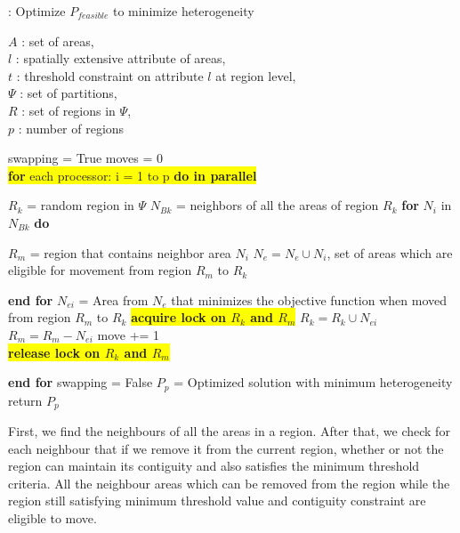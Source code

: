 \documentclass[conference]{IEEEtran}
\begin{document}
\begin{algorithm}
\scriptsize
\caption{: Optimize $P_{feasible}$ to minimize heterogeneity~\cite{r1}}
$A$ : set of areas,\\
$l$ : spatially extensive attribute of areas,\\
$t$ : threshold constraint on attribute $l$ at region level,\\
$\Psi$ : set of partitions,\\
$R$ : set of regions in $\Psi$,\\
$p$ : number of regions
\begin{algorithmic}
\STATE swapping = True
	\STATE moves = 0\\
	\vbox{\colorbox{yellow}{\vbox{\STATE \textbf{for} each processor: i = 1 to p \textbf{do in parallel}}}}
	\begin{ALC@g}	
		\STATE $R_k$ = random region in $\Psi$
		\STATE $N_{Bk}$ = neighbors of all the areas of region $R_k$
		\STATE \textbf{for} $N_i$ in $N_{Bk}$ \textbf{do}
		\begin{ALC@g}
			\STATE $R_m$ = region that contains neighbor area $N_i$
				\STATE $N_e = N_e \cup N_i$, set of areas which are eligible for movement from region $R_m$ to $R_k$
			\ENDIF
		\end{ALC@g}
		\STATE \textbf{end for}
			\STATE $N_{ei}$ = Area from $N_e$ that minimizes the objective function when moved from region $R_m$ to $R_k$
					\vbox{\colorbox{yellow}{\vbox{\STATE \textbf{acquire lock on $R_k$ and $R_m$}}}}
				\STATE $R_k = R_k \cup N_{ei}$
				\STATE $R_m = R_m - N_{ei}$
				\STATE move += 1\\
				\vbox{\colorbox{yellow}{\vbox{\STATE \textbf{release lock on $R_k$ and $R_m$}}}}
			\ENDIF
		\ENDIF
	 \end{ALC@g}
	 \STATE \textbf{end for}
	 	\STATE swapping = False
	 \ENDIF
\ENDWHILE
\STATE $P_p$ = Optimized solution with minimum heterogeneity
\STATE return $P_p$
\end{algorithmic}
\end{algorithm}

First, we find the neighbours of all the areas in a region.  After that, we check for each neighbour that if we remove it from the current region, whether or not the region can maintain its contiguity and also satisfies the minimum threshold criteria. All the neighbour areas which can be removed from the region while the region still satisfying minimum threshold value and contiguity constraint are eligible to move.\\
\end{document}
